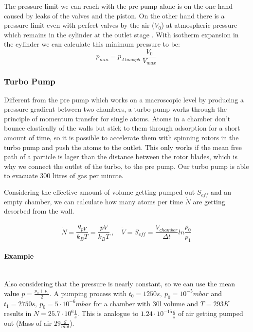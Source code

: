 \documentclass[]{article}
\begin{document}
The pressure limit we can reach with the pre pump alone is on the one hand caused by leaks of the valves and the piston. On the other hand there is a pressure limit even with perfect valves by the air ($V_{0} $) at atmospheric pressure which remains in the cylinder at the outlet stage . With isotherm expansion in the cylinder we can calculate this minimum pressure to be: \[ p_{min}=p_{Atmosph.}\frac{V_{0}}{V_{max}} \]

\subsubsection{Turbo Pump}
Different from the pre pump which works on a macroscopic level by producing a pressure gradient between two chambers, a turbo pump works through the principle of momentum transfer for single atoms. Atoms in a chamber don't bounce elastically of the walls but stick to them through adsorption for a short amount of time, so it is possible to accelerate them with spinning rotors in the turbo pump and push the atoms to the outlet. This only works if the mean free path of a particle is lager than the distance between the rotor blades, which is why we connect the outlet of the turbo, to the pre pump. Our turbo pump is able to evacuate 300 litres of gas per minute.

Considering the effective amount of volume getting pumped out $S_{eff}$ and an empty chamber, we can calculate how many atoms per time $\dot{N}$ are getting desorbed from the wall.

\[ \dot{N}=\frac{q_{pV}}{k_BT}= \frac{p\dot{V}}{k_BT} \: , \quad \dot{V}=S_{eff}= \frac{V_{chamber}}{\Delta t}ln \frac{p_0}{p_1} \]

\paragraph{Example}\mbox{}\\
Also considering that the pressure is nearly constant, so we can use the mean value $p=\frac{p_0+p_1}{2}$. A pumping process with $t_0=1250s,\: p_0=10^{-5}mbar$ and $t_1=2750s,\: p_0=5\cdot 10^{-6}mbar$ for a chamber with 30l volume and $T=293K$ results in $\dot{N}=25.7\cdot 10^{6} \frac{1}{s}$. This is analogue to $1.24\cdot 10^{-15} \frac{g}{s}$ of air getting pumped out (Mass of air $29 \frac{g}{mol}$).
\label{dn}
\end{document}
